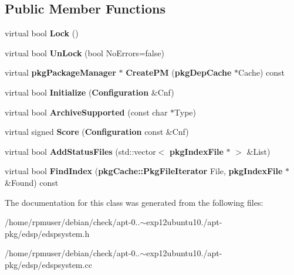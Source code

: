 \subsection*{\-Public \-Member \-Functions}
\begin{DoxyCompactItemize}
\item 
virtual bool {\bfseries \-Lock} ()\label{classedspSystem_a747fd95916e116a6ed37cc641e394c69}

\item 
virtual bool {\bfseries \-Un\-Lock} (bool \-No\-Errors=false)\label{classedspSystem_ab45e970c8ea44bbb120af41fc5e2a43f}

\item 
virtual {\bf pkg\-Package\-Manager} $\ast$ {\bfseries \-Create\-P\-M} ({\bf pkg\-Dep\-Cache} $\ast$\-Cache) const \label{classedspSystem_a9b88e90152156861fc5210e5598d69aa}

\item 
virtual bool {\bfseries \-Initialize} ({\bf \-Configuration} \&\-Cnf)\label{classedspSystem_a295ecf204cefa8729680c2cfdfe7051a}

\item 
virtual bool {\bfseries \-Archive\-Supported} (const char $\ast$\-Type)\label{classedspSystem_a4acb4ef24def19ad4b45c1f10d49f185}

\item 
virtual signed {\bfseries \-Score} ({\bf \-Configuration} const \&\-Cnf)\label{classedspSystem_ad46f817fa35d0bb611e490eb63d44c3d}

\item 
virtual bool {\bfseries \-Add\-Status\-Files} (std\-::vector$<$ {\bf pkg\-Index\-File} $\ast$ $>$ \&\-List)\label{classedspSystem_a87cb2c8845646cd04fb231da6f1721f7}

\item 
virtual bool {\bfseries \-Find\-Index} ({\bf pkg\-Cache\-::\-Pkg\-File\-Iterator} \-File, {\bf pkg\-Index\-File} $\ast$\&\-Found) const \label{classedspSystem_a5a001ca1f36543c5906681574a0b654d}

\end{DoxyCompactItemize}


\-The documentation for this class was generated from the following files\-:\begin{DoxyCompactItemize}
\item 
/home/rpmuser/debian/check/apt-\/0..$\sim$exp12ubuntu10./apt-\/pkg/edsp/edspsystem.\-h\item 
/home/rpmuser/debian/check/apt-\/0..$\sim$exp12ubuntu10./apt-\/pkg/edsp/edspsystem.\-cc\end{DoxyCompactItemize}
